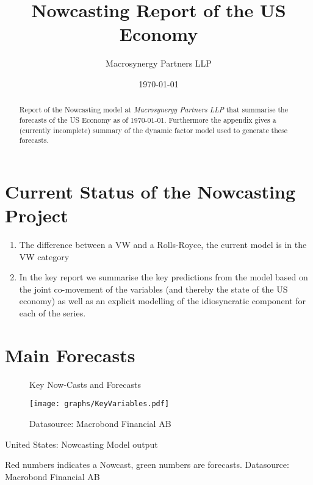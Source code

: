 \documentclass[12pt]{article}
\title{Nowcasting Report of the US Economy}
\author{
	Macrosynergy Partners LLP
	}
\date{\today}
\begin{document}
\maketitle

\begin{abstract}
	Report of the Nowcasting model at \emph{Macrosynergy Partners LLP} that summarise the forecasts of the US Economy as of \today. Furthermore the appendix gives a (currently incomplete) summary of the dynamic factor model used to generate these forecasts.
\end{abstract}



\section{Current Status of the Nowcasting Project}
\begin{enumerate}
	\item	The difference between a VW and a Rolls-Royce, the current model is in the VW category
	\item 	In the key report we summarise the key predictions from the model based on the joint co-movement of the variables (and thereby the state of the US economy) as well as an explicit modelling of the idiosyncratic component for each of the series.
\end{enumerate}





\section{Main Forecasts}

\begin{figure}[ht]
	\centering
	\caption{Key Now-Casts and Forecasts}
	\texttt{[image: graphs/KeyVariables.pdf]}
	\caption*{\small{Datasource: Macrobond Financial AB}}
\end{figure}


\begin{landscape}
	\begin{table}[ht]
		\caption{United States: Nowcasting Model output}
		
		\label{tab:table4}
		\centering
		\caption*{\small{Red numbers indicates a Nowcast, green numbers are forecasts. Datasource: Macrobond Financial AB}}
	\end{table}
\end{landscape}
\end{document}

